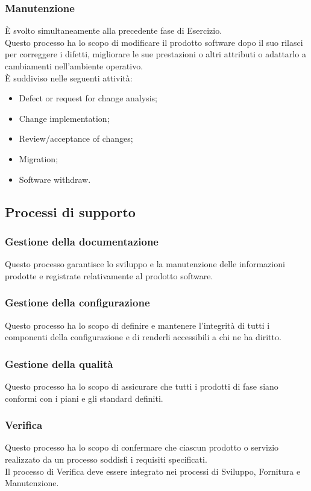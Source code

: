\subsubsection{Manutenzione}
È svolto simultaneamente alla precedente fase di Esercizio.\\
Questo processo ha lo scopo di modificare il prodotto software dopo il suo rilasci per correggere i difetti, migliorare le sue prestazioni o altri attributi o adattarlo a cambiamenti nell'ambiente operativo.\\
È suddiviso nelle seguenti attività:
\begin{itemize}
  \item Defect or request for change analysis;
  \item Change implementation;
  \item Review/acceptance of changes;
  \item Migration;
  \item Software withdraw.
\end{itemize}

\subsection{Processi di supporto} \label{subsection:processi_supporto}
\subsubsection{Gestione della documentazione}
Questo processo garantisce lo sviluppo e la manutenzione delle informazioni prodotte e registrate relativamente al prodotto software. 

\subsubsection{Gestione della configurazione}
Questo processo ha lo scopo di definire e mantenere l'integrità di tutti i componenti della configurazione e di renderli accessibili a chi ne ha diritto.

\subsubsection{Gestione della qualità}
Questo processo ha lo scopo di assicurare che tutti i prodotti di fase siano conformi con i piani e gli standard definiti.

\subsubsection{Verifica}
Questo processo ha lo scopo di confermare che ciascun prodotto o servizio realizzato da un processo soddisfi i requisiti specificati.\\
Il processo di Verifica deve essere integrato nei processi di Sviluppo, Fornitura e Manutenzione.

